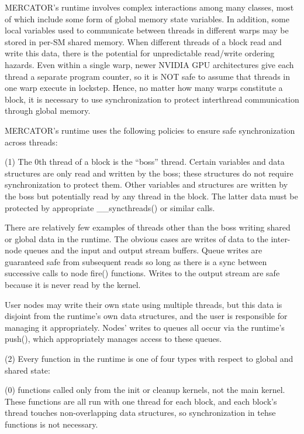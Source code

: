 MERCATOR's runtime involves complex interactions among many classes,
most of which include some form of global memory state variables.  In
addition, some local variables used to communicate between threads in
different warps may be stored in per-SM shared memory.  When different
threads of a block read and write this data, there is the potential
for unpredictable read/write ordering hazards.  Even within a single
warp, newer NVIDIA GPU architectures give each thread a separate
program counter, so it is NOT safe to assume that threads in one warp
execute in lockstep.  Hence, no matter how many warps constitute a
block, it is necessary to use synchronization to protect interthread
communication through global memory.

MERCATOR's runtime uses the following policies to ensure safe
synchronization across threads:

(1) The 0th thread of a block is the ``boss'' thread.  Certain
variables and data structures are only read and written by the boss;
these structures do not require synchronization to protect them.
Other variables and structures are written by the boss but potentially
read by any thread in the block.  The latter data must be protected
by appropriate __syncthreads() or similar calls.

There are relatively few examples of threads other than the boss
writing shared or global data in the runtime.  The obvious cases are
writes of data to the inter-node queues and the input and output
stream buffers. Queue writes are guaranteed safe from subsequent reads
so long as there is a sync between successive calls to node fire()
functions.  Writes to the output stream are safe because it is never
read by the kernel.

User nodes may write their own state using multiple threads, but this
data is disjoint from the runtime's own data structures, and the user
is responsible for managing it appropriately.  Nodes' writes to queues
all occur via the runtime's push(), which appropriately manages access
to these queues.

(2) Every function in the runtime is one of four types with respect
    to global and shared state:

  (0) functions called only from the init or cleanup kernels, not
      the main kernel.  These functions are all run with one thread
      for each block, and each block's thread touches non-overlapping
      data structures, so synchronization in tehse functions is not
      necessary.

